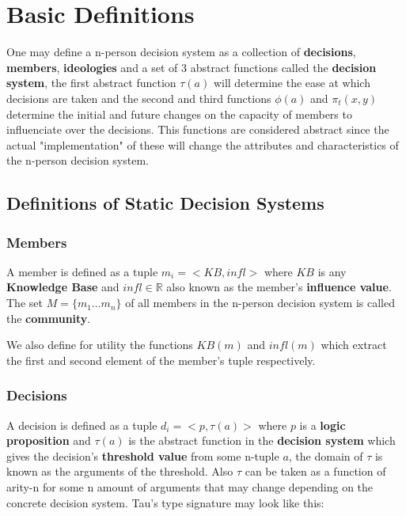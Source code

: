 % 
%
\section{Basic Definitions}\label{basic definitions}

One may define a n-person decision system as a collection of \textbf{decisions}, \textbf{members}, \textbf{ideologies} and a set of 3 abstract functions called the \textbf{decision system}, the first abstract function $\tau(a)$ will determine the ease at which decisions are taken and the second and third functions $\phi(a)$ and $\pi_{t}(x, y)$ determine the initial and future changes on the capacity of members to influenciate over the decisions. This functions are considered abstract since the actual "implementation" of these will change the attributes and characteristics of the n-person decision system.

\subsection{Definitions of Static Decision Systems}

\subsubsection{Members} 

A member is defined as a tuple $m_{i}=<KB, infl>$ where $KB$ is any \textbf{Knowledge Base} and $infl\in\mathbb{R}$ also known as the member's \textbf{influence value}. The set $M = \{m_{1} \ldots m_{n}\}$ of all members in the n-person decision system is called the \textbf{community}.

We also define for utility the functions $KB(m)$ and $infl(m)$ which extract the first and second element of the member's tuple respectively.

\subsubsection{Decisions} 

A decision is defined as a tuple $d_{i}=<p,\tau(a)>$ where $p$ is a \textbf{logic proposition} and $\tau(a)$ is the abstract function in the \textbf{decision system} which gives the decision's \textbf{threshold value} from some n-tuple $a$, the domain of $\tau$ is known as the arguments of the threshold. Also $\tau$ can be taken as a function of arity-n for some n amount of arguments that may change depending on the concrete decision system. Tau's type signature may look like this:

